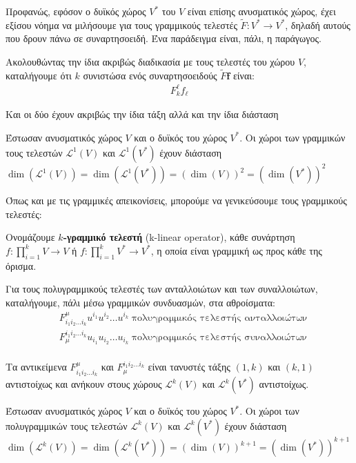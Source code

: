 \documentclass[main.tex]{subfiles}
\begin{document}
	Προφανώς, εφόσον ο δυϊκός χώρος $V^*$ του $V$ είναι επίσης ανυσματικός χώρος, έχει εξίσου νόημα να μιλήσουμε για τους γραμμικούς τελεστές ${\tilde{F}:V^*\rightarrow V^*}$, δηλαδή αυτούς που δρουν πάνω σε συναρτησοειδή. Ένα παράδειγμα είναι, πάλι, η παράγωγος.
	
	Ακολουθώντας την ίδια ακριβώς διαδικασία με τους τελεστές του χώρου $V$, καταλήγουμε ότι $k$ συνιστώσα ενός συναρτησοειδούς $\tilde{F}\boldsymbol{f}$ είναι:
	\begin{align*}
		F_k^\ell f_\ell
	\end{align*}

	Και οι δύο έχουν ακριβώς την ίδια τάξη αλλά και την ίδια διάσταση
	\begin{corollary}
		Έστωσαν ανυσματικός χώρος $V$ και ο δυϊκός του χώρος $V^*$. Οι χώροι των γραμμικών τους τελεστών $\mathcal{L}^1(V)$ και $\mathcal{L}^1(V^*)$ έχουν διάσταση $\dim(\mathcal{L}^1(V)) = \dim(\mathcal{L}^1(V^*)) = (\dim(V))^2 = (\dim(V^*))^2$
	\end{corollary}

	Όπως και με τις γραμμικές απεικονίσεις, μπορούμε να γενικεύσουμε τους γραμμικούς τελεστές:
	\begin{definition}
		Ονομάζουμε \textbf{$k$-γραμμικό τελεστή} (k-linear operator), κάθε συνάρτηση $f:\prod_{i=1}^{k}V\rightarrow V$ ή $f:\prod_{i=1}^{k}V^*\rightarrow V^*$, η οποία είναι γραμμική ως προς κάθε της όρισμα.
	\end{definition}

	Για τους πολυγραμμικούς τελεστές των ανταλλοιώτων και των συναλλοιώτων, καταλήγουμε, πάλι μέσω γραμμικών συνδυασμών, στα αθροίσματα:
	\begin{align*}
		&F^\mu_{i_1i_2\ldots i_k}u^{i_1}u^{i_2}\ldots u^{i_k} \; \text{πολυγραμμικός τελεστής ανταλλοιώτων} \\
		&F_\mu^{i_1i_2\ldots i_k}u_{i_1}u_{i_2}\ldots u_{i_k} \; \text{πολυγραμμικός τελεστής συναλλοιώτων} \\
	\end{align*}
	
	Τα αντικείμενα $F^\mu_{i_1i_2\ldots i_k}$ και $F_\mu^{i_1i_2\ldots i_k}$ είναι τανυστές τάξης $(1,k)$ και $(k,1)$ αντιστοίχως και ανήκουν στους χώρους $\mathcal{L}^k(V)$ και $\mathcal{L}^{k}(V^*)$ αντιστοίχως.
	
	\begin{corollary}
		Έστωσαν ανυσματικός χώρος $V$ και ο δυϊκός του χώρος $V^*$. Οι χώροι των πολυγραμμικών τους τελεστών $\mathcal{L}^k(V)$ και $\mathcal{L}^k(V^*)$ έχουν διάσταση $\dim(\mathcal{L}^k(V)) = \dim(\mathcal{L}^k(V^*)) = (\dim(V))^{k+1} = (\dim(V^*))^{k+1}$
	\end{corollary}
	
\end{document}
